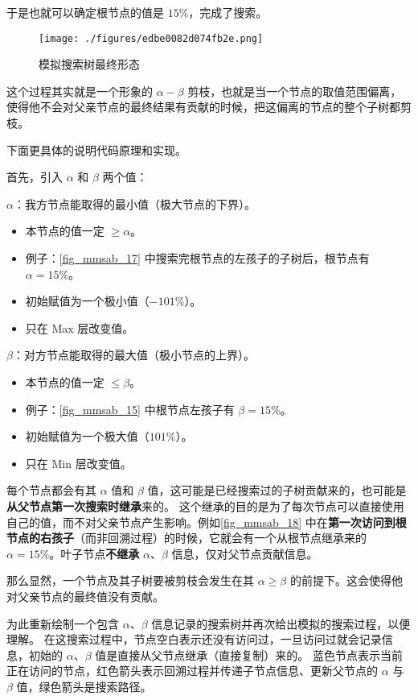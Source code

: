 于是也就可以确定根节点的值是 $15\%$，完成了搜索。

\begin{figure}[ht]
\centering
\texttt{[image: ./figures/edbe0082d074fb2e.png]}
\caption{模拟搜索树最终形态} \label{fig_mmsab_20}
\end{figure}

这个过程其实就是一个形象的 $\alpha-\beta$ 剪枝，也就是当一个节点的取值范围偏离，使得他不会对父亲节点的最终结果有贡献的时候，把这偏离的节点的整个子树都剪枝。

下面更具体的说明代码原理和实现。

首先，引入 $\alpha$ 和 $\beta$ 两个值：

$\alpha$：我方节点能取得的最小值（极大节点的下界）。
\begin{itemize}
\item 本节点的值一定 $\ge\alpha$。
\item 例子：\autoref{fig_mmsab_17} 中搜索完根节点的左孩子的子树后，根节点有 $\alpha = 15\%$。
\item 初始赋值为一个极小值（$-101\%$）。
\item 只在 Max 层改变值。
\end{itemize}

$\beta$：对方节点能取得的最大值（极小节点的上界）。
\begin{itemize}
\item 本节点的值一定 $\le \beta$。
\item 例子：\autoref{fig_mmsab_15} 中根节点左孩子有 $\beta = 15\%$。
\item 初始赋值为一个极大值（$101\%$）。
\item 只在 Min 层改变值。
\end{itemize}
每个节点都会有其 $\alpha$ 值和 $\beta$ 值，这可能是已经搜索过的子树贡献来的，也可能是\textbf{从父节点第一次搜索时继承}来的。
这个继承的目的是为了每次节点可以直接使用自己的值，而不对父亲节点产生影响。例如\autoref{fig_mmsab_18} 中在\textbf{第一次访问到根节点的右孩子}（而非回溯过程）的时候，它就会有一个从根节点继承来的 $\alpha = 15\%$。叶子节点\textbf{不继承} $\alpha$、$\beta$ 信息，仅对父节点贡献信息。

那么显然，一个节点及其子树要被剪枝会发生在其 $\alpha \ge \beta$ 的前提下。这会使得他对父亲节点的最终值没有贡献。

为此重新绘制一个包含 $\alpha$、$\beta$ 信息记录的搜索树并再次给出模拟的搜索过程，以便理解。
在这搜索过程中，节点空白表示还没有访问过，一旦访问过就会记录信息，初始的 $\alpha$、$\beta$ 值是直接从父节点继承（直接复制）来的。
蓝色节点表示当前正在访问的节点，红色箭头表示回溯过程并传递子节点信息、更新父节点的 $\alpha$ 与 $\beta$ 值，绿色箭头是搜索路径。

